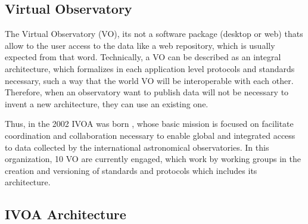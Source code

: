 \subsection{Virtual Observatory}


The Virtual Observatory (VO), its not a software package (desktop or web) thats
allow to the user access to the data like a web repository, which is usually
expected from that word. Technically, a VO can be described as an integral
architecture, which formalizes in each application level protocols and
standards necessary, such a way that the world VO will be interoperable with
each other.  Therefore, when an observatory want to publish data will not be
necessary to invent a new architecture, they can use an existing one.

Thus, in the 2002 IVOA was born \cite{ivoa}, whose basic mission is focused on
facilitate coordination and collaboration necessary to enable global and
integrated access to data collected by the international astronomical
observatories. In this organization, 10 VO are currently engaged, which work by
working groups in the creation and versioning of standards and protocols which
includes its architecture.

\subsection{IVOA Architecture}


